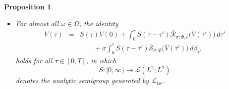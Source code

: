 \documentclass[10pt]{articleHJ}
\newtheorem{prop}[thm]{Proposition}
\numberwithin{equation}{section}
\begin{document}
\begin{prop}
\begin{itemize}
{\begin{equation}
\begin{array}{lcl}
       \, d \beta_{\tau'}
  \end{array}
  \end{equation}
  holds for all $0 \le t \le T$.
}
\item[(vi)]{
  For almost all $\omega \in \Omega$,
  the identity
  \begin{equation}
  \label{eq:md:int:eq:mild:formulation}
  \begin{array}{lcl}
    \overline{V}(\tau)
     & = & S(\tau) \overline{V}(0)
     + \int_0^\tau S(\tau - \tau')
         \overline{\mathcal{R}}_{\sigma;\Phi,c}
           \big(\overline{V}(\tau')\big)
       \, d \tau'
   \\[0.2cm]
   & & \qquad
     + \sigma \int_0^\tau S(\tau - \tau')
         \overline{\mathcal{S}}_{\sigma;\Phi}
           \big(\overline{V}(\tau')\big)
              \, d \beta_{\tau'}
  \end{array}
  \end{equation}
  holds for all $\tau \in [0, T]$, in which
  \begin{equation}
    S: [0, \infty) \to \mathcal{L}(L^2;L^2)
  \end{equation}
  denotes the analytic semigroup generated by $\mathcal{L}_{\mathrm{tw}}$.
}
\end{itemize}
\end{prop}
\end{document}
